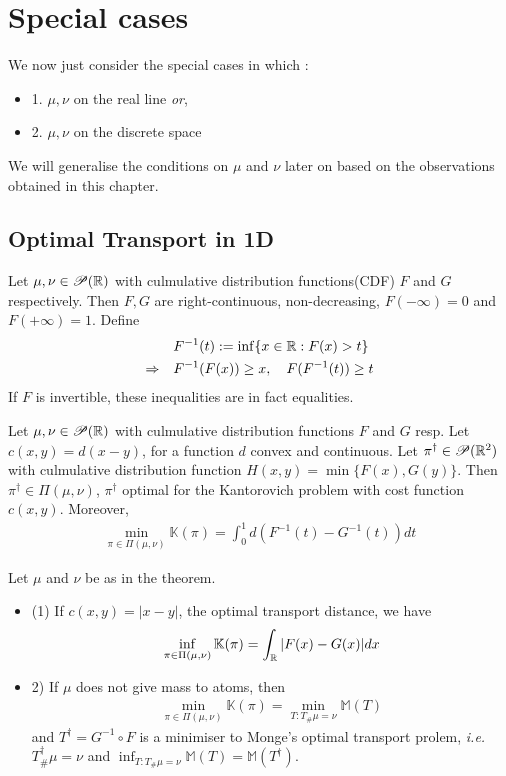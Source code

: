 \documentclass[12pt,a4paper]{article}
\renewenvironment{i}
{\begin{itemize} 
	}%
	{\end{itemize}
}
\begin{document}
\section{Special cases}
We  now just consider the special cases in which :
\begin{i}
\item[1.] $\mu, \nu$ on the real line \emph{or},
\item[2.] $\mu, \nu$ on the discrete space
\end{i}

We will generalise the conditions on $\mu$ and $\nu$ later on based on the observations obtained in this chapter.

\subsection{Optimal Transport in 1D}

Let $\mu, \nu\in \mathscr{P}(\mathbb{R})$ with culmulative distribution functions(CDF) $F$ and $G$ respectively.  Then $F,G$ are right-continuous, non-decreasing, $F(-\infty) =0$ and $F(+\infty) =1$. Define
\begin{align*}
&F^{-1}(t) : = \inf \{x\in \mathbb{R} : F(x)>t \}\\
\Rightarrow \quad & F^{-1}(F(x)) \geq x, \quad F(F^{-1}(t))\geq t
\end{align*}
If $F$ is invertible, these inequalities are in fact equalities.
\s

 Let $\mu, \nu \in \mathscr{P}(\mathbb{R})$ with culmulative distribution functions $F$ and $G$ resp. Let $c(x,y)= d(x-y)$, for a function $d$ convex and continuous. Let $\pi^{\dagger} \in \mathscr{P}(\mathbb{R}^2)$ with culmulative distribution function $H(x,y) = \min\{F(x), G(y)\}$. Then $\pi^{\dagger} \in \Pi(\mu, \nu)$, $\pi^{\dagger}$ optimal for the Kantorovich problem with cost function $c(x,y)$. Moreover,
\begin{align*}
\min_{\pi \in \Pi(\mu, \nu)}\mathbb{K}(\pi ) =\int_0^1 d(F^{-1}(t) - G^{-1}(t))dt
\end{align*}
\s

 Let $\mu$ and $\nu$ be as in the theorem.
\begin{i}
\item[(1)] If $c(x,y) = |x-y|$, the optimal transport distance, we have
\begin{align*}
\inf_{\pi \in \Pi(\mu, \nu)} \mathbb{K}(\pi) = \int_{\mathbb{R}} |F(x) - G(x)| dx
\end{align*}
\item[2)] If $\mu$ does not give mass to atoms, then 
\begin{align*}
\min_{\pi \in \Pi(\mu, \nu)} \mathbb{K}(\pi) = \min_{T: T_{\#}\mu =\nu} \mathbb{M}(T)
\end{align*}
and $T^{\dagger} = G^{-1}\circ F$ is a minimiser to Monge's optimal transport prolem, \textit{i.e.} $T_{\#}^{\dagger} \mu = \nu$ and $\inf_{T: T_{\#} \mu = \nu} \mathbb{M}(T) = \mathbb{M}(T^{\dagger})$.
\end{i}
\s
\end{document}
